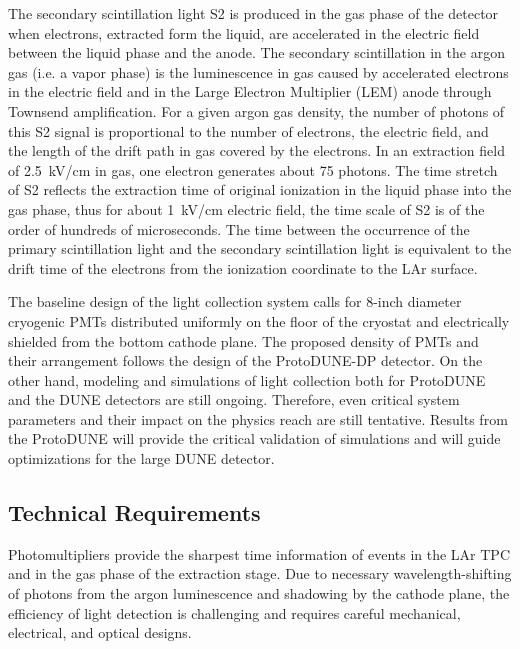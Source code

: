 The secondary scintillation light S2 is produced in the gas phase of the detector when electrons, extracted form the liquid, are accelerated in the electric field between the liquid phase and the anode. The secondary scintillation in the argon gas (i.e. a vapor phase) is the luminescence in gas caused by accelerated electrons in the electric field and in the Large Electron Multiplier (LEM) anode through Townsend amplification. For a given argon gas density, the number of photons of this S2 signal is proportional to the number of electrons, the electric field, and the length of the drift path in gas covered by the electrons. In an extraction field of \SI{2.5}{kV/cm} in gas, one electron generates about \num{75} photons. The time stretch of S2 reflects the extraction time of original ionization in the liquid phase into the gas phase, thus for about \SI{1}{kV/cm} electric field, the time scale of S2 is of the order of hundreds of microseconds. The time between the occurrence of the primary scintillation light and the secondary scintillation light is equivalent to the drift time of the electrons from the ionization coordinate to the LAr surface.

The baseline design of the light collection system calls for 8-inch diameter cryogenic PMTs distributed uniformly on the floor of the cryostat and electrically shielded from the bottom cathode plane. The proposed density of PMTs and their arrangement follows the design of the ProtoDUNE-DP detector. On the other hand, modeling and simulations of light collection both for ProtoDUNE and the DUNE detectors are still ongoing. Therefore, even critical system parameters and their impact on the physics reach are still tentative. Results from the ProtoDUNE will provide the critical validation of simulations and will guide optimizations for the large DUNE detector.

\subsection{Technical Requirements}
\label{sec:fddp-pd-1.3}

Photomultipliers provide the sharpest time information of events in the LAr TPC and in the gas phase of the extraction stage. Due to necessary wavelength-shifting of photons from the argon luminescence and shadowing by the cathode plane, the efficiency of light detection is challenging and requires careful mechanical, electrical, and optical designs.


